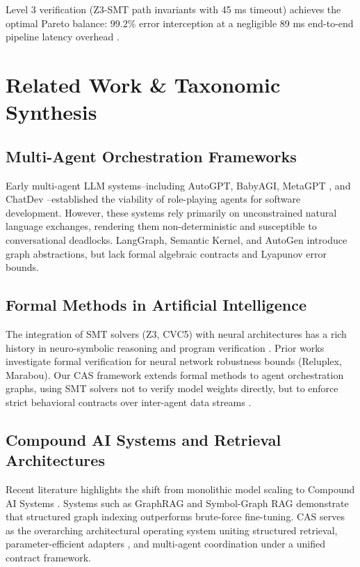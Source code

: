 \documentclass[10pt,twocolumn,letterpaper]{article}
\begin{document}
Level 3 verification (Z3-SMT path invariants with 45 ms timeout) achieves the optimal Pareto balance: $99.2\%$ error interception at a negligible 89 ms end-to-end pipeline latency overhead \cite{arxiv_2404_01131}.




\section{Related Work \& Taxonomic Synthesis}



\subsection{Multi-Agent Orchestration Frameworks}

Early multi-agent LLM systems--including AutoGPT, BabyAGI, MetaGPT \cite{arxiv_2412_06333}, and ChatDev \cite{arxiv_2404_01131}--established the viability of role-playing agents for software development. However, these systems rely primarily on unconstrained natural language exchanges, rendering them non-deterministic and susceptible to conversational deadlocks. LangGraph, Semantic Kernel, and AutoGen introduce graph abstractions, but lack formal algebraic contracts and Lyapunov error bounds.


\subsection{Formal Methods in Artificial Intelligence}

The integration of SMT solvers (Z3, CVC5) with neural architectures has a rich history in neuro-symbolic reasoning and program verification \cite{crossref_10_18653_v1_2026_findings_acl_1933}. Prior works investigate formal verification for neural network robustness bounds (Reluplex, Marabou). Our CAS framework extends formal methods to agent orchestration graphs, using SMT solvers not to verify model weights directly, but to enforce strict behavioral contracts over inter-agent data streams \cite{arxiv_2404_01131}.


\subsection{Compound AI Systems and Retrieval Architectures}

Recent literature highlights the shift from monolithic model scaling to Compound AI Systems \cite{arxiv_2406_00584,arxiv_2005_14165}. Systems such as GraphRAG \cite{crossref_10_1145_3689096_3689462} and Symbol-Graph RAG demonstrate that structured graph indexing outperforms brute-force fine-tuning. CAS serves as the overarching architectural operating system uniting structured retrieval, parameter-efficient adapters \cite{arxiv_2305_18290}, and multi-agent coordination under a unified contract framework.
\end{document}
